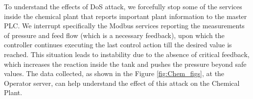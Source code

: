 To understand the effects of DoS attack, we forcefully stop some of the services inside the chemical plant that reports important plant information to the master PLC. We interrupt specifically the Modbus services reporting the measurements of pressure and feed flow (which is a necessary feedback), upon which the controller continues executing the last control action till the desired value is reached. This situation leads to instability due to  the absence of critical feedback, which increases the reaction inside the tank and pushes the pressure beyond safe values. 
The data collected, as shown in the Figure \ref{fig:Chem_figs}, at the Operator server, can help understand the effect of this attack on the Chemical Plant.








